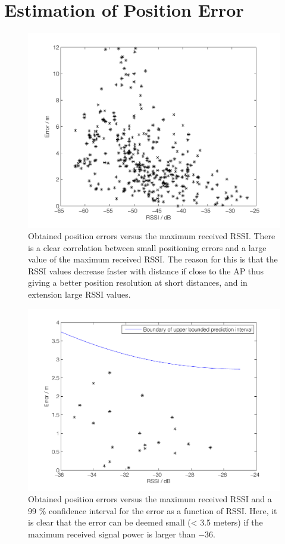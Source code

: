 \documentclass{LTHthesis}
\begin{document}
\section{Estimation of Position Error} %
%
\begin{figure}[!hbt]

\includegraphics[width=1\textwidth ]{images/adapt_parameters/error_vs_maxP_all}
\caption{Obtained position errors versus the maximum received RSSI. There is a clear correlation between small positioning errors and a large value of the maximum received RSSI. The reason for this is that the RSSI values decrease faster with distance if close to the AP thus giving a better position resolution at short distances, and in extension large RSSI values.}\label{error_vs_maxp_all}
\end{figure}
%
\begin{figure}[!hbt]

\includegraphics[width=1\textwidth ]{images/adapt_parameters/prediction_interval}
\caption{Obtained position errors versus the maximum received RSSI and a 99 \% confidence interval for the error as a function of RSSI. Here, it is clear that the error can be deemed small (< 3.5 meters) if the maximum received signal power is larger than $-36$.}\label{prediction_interval}
\end{figure}
\end{document}
